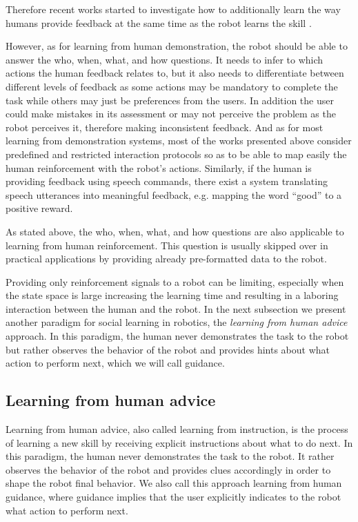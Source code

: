 Therefore recent works started to investigate how to additionally learn the way humans provide feedback at the same time as the robot learns the skill \cite{knox2009interactively}. 

However, as for learning from human demonstration, the robot should be able to answer the who, when, what, and how questions. It needs to infer to which actions the human feedback relates to, but it also needs to differentiate between different levels of feedback as some actions may be mandatory to complete the task while others may just be preferences from the users. In addition the user could make mistakes in its assessment or may not perceive the problem as the robot perceives it, therefore making inconsistent feedback. And as for most learning from demonstration systems, most of the works presented above consider predefined and restricted interaction protocols so as to be able to map easily the human reinforcement with the robot's actions. Similarly, if the human is providing feedback using speech commands, there exist a system translating speech utterances into meaningful feedback, e.g. mapping the word ``good'' to a positive reward.

\transition

As stated above, the who, when, what, and how questions are also applicable to learning from human reinforcement. This question is usually skipped over in practical applications by providing already pre-formatted data to the robot.

Providing only reinforcement signals to a robot can be limiting, especially when the state space is large increasing the learning time and resulting in a laboring interaction between the human and the robot. In the next subsection we present another paradigm for social learning in robotics, the \emph{learning from human advice} approach. In this paradigm, the human never demonstrates the task to the robot but rather observes the behavior of the robot and provides hints about what action to perform next, which we will call guidance.

\subsection{Learning from human advice}

Learning from human advice, also called learning from instruction, is the process of learning a new skill by receiving explicit instructions about what to do next. In this paradigm, the human never demonstrates the task to the robot. It rather observes the behavior of the robot and provides clues accordingly in order to shape the robot final behavior. We also call this approach learning from human guidance, where guidance implies that the user explicitly indicates to the robot what action to perform next.

